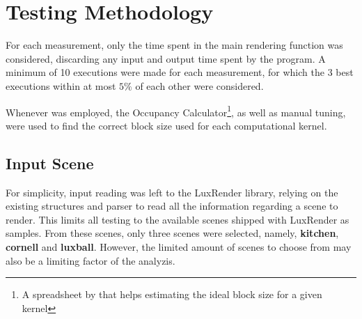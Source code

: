 \documentclass[main.tex]{subfiles}
\begin{document}
\section{Testing Methodology} \label{sec:results:method}

For each measurement, only the time spent in the main rendering function was considered, discarding any input and output time spent by the program. A minimum of 10 executions were made for each measurement, for which the 3 best executions within at most $5\%$ of each other were considered.

Whenever \cuda was employed, the \cuda Occupancy Calculator\footnote{A spreadsheet by \nvidia that helps estimating the ideal block size for a given kernel}, as well as manual tuning, were used to find the correct block size used for each computational kernel.

\subsection{Input Scene}

For simplicity, input reading was left to the LuxRender library, relying on the existing structures and parser to read all the information regarding a scene to render. This limits all testing to the available scenes shipped with LuxRender as samples. From these scenes, only three scenes were selected, namely, \textbf{kitchen}, \textbf{cornell} and \textbf{luxball}. However, the limited amount of scenes to choose from may also be a limiting factor of the analyzis.
\end{document}
